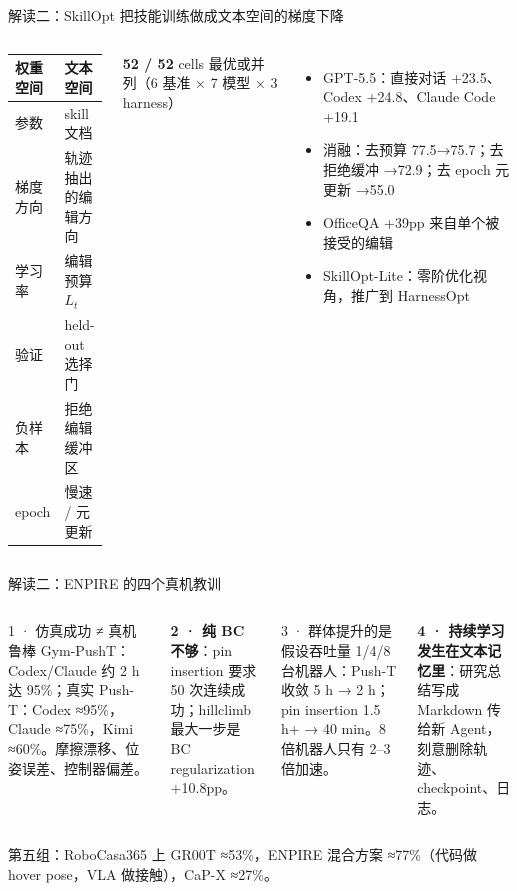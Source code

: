 \documentclass[aspectratio=169,10pt]{beamer}
\newcommand{\con}[1]{\textcolor{negative}{#1}}
\newcommand{\HL}[1]{\textcolor{emphasis}{#1}}
\begin{document}
\begin{frame}{解读二：SkillOpt 把技能训练做成文本空间的梯度下降}
\begin{columns}[T]
\begin{center}
\small
\begin{tabular}{@{}ll@{}}
\toprule
权重空间 & 文本空间 \\
\midrule
参数 & skill 文档 \\
梯度方向 & 轨迹抽出的编辑方向 \\
学习率 & 编辑预算 $L_t$ \\
验证 & held-out 选择门 \\
负样本 & 拒绝编辑缓冲区 \\
epoch & 慢速 / 元更新 \\
\bottomrule
\end{tabular}
\end{center}
\textbf{52 / 52} cells 最优或并列（6 基准 × 7 模型 × 3 harness）
\begin{itemize}
  \item GPT-5.5：直接对话 +23.5、Codex +24.8、Claude Code +19.1
  \item 消融：去预算 77.5→75.7；去拒绝缓冲 →72.9；\con{去 epoch 元更新 →55.0}
  \item OfficeQA +39pp 来自单个被接受的编辑
  \item SkillOpt-Lite：零阶优化视角，推广到 HarnessOpt
\end{itemize}
\end{columns}
\end{frame}

\begin{frame}{解读二：ENPIRE 的四个真机教训}
\begin{columns}[T]
\begin{block}{1 · 仿真成功 ≠ 真机鲁棒}
Gym-PushT：Codex/Claude 约 2 h 达 95\%；真实 Push-T：Codex ≈95\%，Claude ≈75\%，Kimi ≈60\%。摩擦漂移、位姿误差、控制器偏差。
\end{block}
\textbf{2 · 纯 BC 不够}：pin insertion 要求 50 次连续成功；hillclimb 最大一步是 BC regularization +10.8pp。
\begin{block}{3 · 群体提升的是假设吞吐量}
1/4/8 台机器人：Push-T 收敛 5 h → 2 h；pin insertion 1.5 h+ → 40 min。8 倍机器人只有 2--3 倍加速。
\end{block}
\textbf{4 · 持续学习发生在文本记忆里}：研究总结写成 Markdown 传给新 Agent，刻意删除轨迹、checkpoint、日志。
\end{columns}
\vspace{6pt}
第五组：RoboCasa365 上 GR00T ≈53\%，\HL{ENPIRE 混合方案 ≈77\%}（代码做 hover pose，VLA 做接触），CaP-X ≈27\%。
\end{frame}
\end{document}
